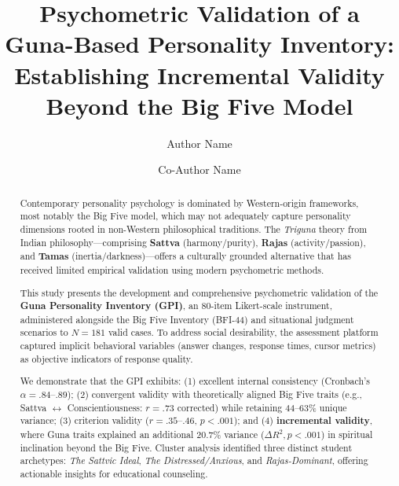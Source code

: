 \documentclass[runningheads]{llncs}
\begin{document}
\title{Psychometric Validation of a Guna-Based Personality Inventory: Establishing Incremental Validity Beyond the Big Five Model}

\author{Author Name \and Co-Author Name}



\maketitle

\begin{abstract}
Contemporary personality psychology is dominated by Western-origin frameworks, most notably the Big Five model, which may not adequately capture personality dimensions rooted in non-Western philosophical traditions. The \textit{Triguna} theory from Indian philosophy---comprising \textbf{Sattva} (harmony/purity), \textbf{Rajas} (activity/passion), and \textbf{Tamas} (inertia/darkness)---offers a culturally grounded alternative that has received limited empirical validation using modern psychometric methods.

This study presents the development and comprehensive psychometric validation of the \textbf{Guna Personality Inventory (GPI)}, an 80-item Likert-scale instrument, administered alongside the Big Five Inventory (BFI-44) and situational judgment scenarios to $N = 181$ valid cases. To address social desirability, the assessment platform captured implicit behavioral variables (answer changes, response times, cursor metrics) as objective indicators of response quality.

We demonstrate that the GPI exhibits: (1) excellent internal consistency (Cronbach's $\alpha = .84$--$.89$); (2) convergent validity with theoretically aligned Big Five traits (e.g., Sattva $\leftrightarrow$ Conscientiousness: $r = .73$ corrected) while retaining 44--63\% unique variance; (3) criterion validity ($r = .35$--$.46$, $p < .001$); and (4) \textbf{incremental validity}, where Guna traits explained an additional 20.7\% variance ($\Delta R^2, p < .001$) in spiritual inclination beyond the Big Five. Cluster analysis identified three distinct student archetypes: \textit{The Sattvic Ideal}, \textit{The Distressed/Anxious}, and \textit{Rajas-Dominant}, offering actionable insights for educational counseling.

\end{abstract}
\end{document}
